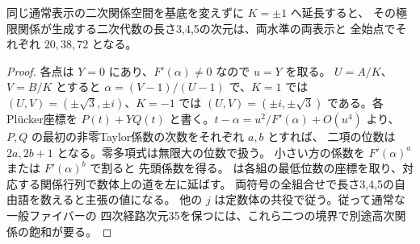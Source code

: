 \begin{proposition}
同じ通常表示の二次関係空間を基底を変えずに $K=\pm1$ へ延長すると、
その極限関係が生成する二次代数の長さ3,4,5の次元は、両水準の両表示と
全始点でそれぞれ $20,38,72$ となる。
\end{proposition}
\begin{proof}
各点は $Y=0$ にあり、$F'(\alpha)\ne0$ なので $u=Y$ を取る。
$U=A/K$、$V=B/K$ とすると
$\alpha=(V-1)/(U-1)$ で、$K=1$ では
$(U,V)=(\pm\sqrt3,\pm i)$、$K=-1$ では
$(U,V)=(\pm i,\pm\sqrt3)$ である。各Pl\"ucker座標を
$P(t)+YQ(t)$ と書く。$t-\alpha=u^2/F'(\alpha)+O(u^4)$ より、
$P,Q$ の最初の非零Taylor係数の次数をそれぞれ $a,b$ とすれば、
二項の位数は $2a,2b+1$ となる。零多項式は無限大の位数で扱う。
小さい方の係数を $F'(\alpha)^a$ または $F'(\alpha)^b$ で割ると
先頭係数を得る。
は各組の最低位数の座標を取り、対応する関係行列で数体上の道を左に延ばす。
両符号の全組合せで長さ3,4,5の自由語を数えると主張の値になる。
他の $j$ は定数体の共役で従う。従って通常な一般ファイバーの
四次経路次元35を保つには、これら二つの境界で別途高次関係の飽和が要る。
\end{proof}
